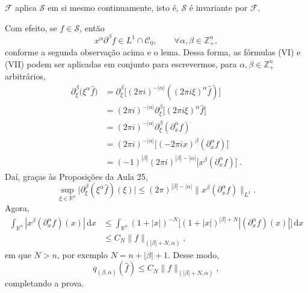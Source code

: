 \documentclass[../distribution_theory_notes.tex]{subfiles}
\begin{document}
\begin{theorem*}
	\(\mathcal{F}\) aplica \(\mathcal{S}\) em si mesmo continuamente, isto é, \(\mathcal{S}\) é invariante por \(\mathcal{F}\).
\end{theorem*}
\begin{proof*}
	Com efeito, se \(f\in \mathcal{S}\), então
	\[
		x^{\alpha }\partial ^{\beta }f\in L^{1}\cap \mathcal{C}_{0},\qquad \forall \alpha ,\beta \in \mathbb{Z}_{+}^{n},
	\]
	conforme a segunda observação acima e o lema. Dessa forma, as fórmulas (VI) e (VII) podem ser aplicadas em conjunto para escrevermos, para \(\alpha ,\beta \in \mathbb{Z}_{+}^{n}\) arbitrários,
	\begin{align*}
		\partial _{\xi }^{\beta }\bigl(\xi ^{\alpha }\hat{f}\bigr)
		 & =\partial _{\xi }^{\beta }\bigl[(2\pi i)^{-|\alpha |}((2\pi i\xi )^{\alpha }\hat{f})\bigr]                     \\
		 & =(2\pi i)^{-|\alpha |}\partial _{\xi }^{\beta }\bigl[(2\pi i\xi )^{\alpha }\hat{f}\bigr]                       \\
		 & =(2\pi i)^{-|\alpha |}\partial _{\xi }^{\beta }(\partial _{x}^{\alpha }f)^{\widehat{\; }}                      \\
		 & =(2\pi i)^{-|\alpha |}\bigl[(-2\pi i x)^{\beta }(\partial _{x}^{\alpha }f)\bigr]^{\widehat{\; }}               \\
		 & =(-1)^{|\beta |}(2\pi i)^{|\beta |-|\alpha |}\bigl[x^{\beta }(\partial _{x}^{\alpha }f)\bigr]^{\widehat{\; }}.
	\end{align*}
	Daí, graças às Proposições da Aula 25,
	\[
		\sup_{\xi \in \mathbb{R}^{n}}\bigl|\partial _{\xi }^{\beta }(\xi ^{\alpha }\hat{f})(\xi )\bigr|
		\leq (2\pi )^{|\beta |-|\alpha |}\bigl\|x^{\beta }(\partial _{x}^{\alpha }f)\bigr\|_{L^{1}}.
	\]
	Agora,
	\begin{align*}
		\int_{\mathbb{R}^{n}}|x^{\beta }(\partial _{x}^{\alpha }f)(x)|\,\mathrm{d}x
		 & \leq \int_{\mathbb{R}^{n}}(1+|x|)^{-N}\bigl[(1+|x|)^{|\beta |+N}|(\partial _{x}^{\alpha }f)(x)|\bigr] \,\mathrm{d}x \\
		 & \leq C_{N}\|f\|_{(|\beta |+N,\alpha )},
	\end{align*}
	em que \(N>n\), por exemplo \(N=n+|\beta |+1\). Desse modo,
	\[
		q_{(\beta ,\alpha )}(\hat{f})\leq C_{N}\|f\|_{(|\beta |+N,\alpha )},
	\]
	completando a prova. \qedsymbol
\end{proof*}
\end{document}
